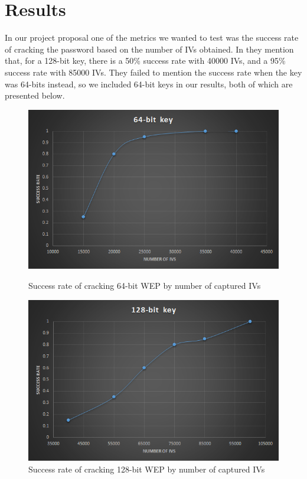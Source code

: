 \documentclass[10pt, titlepage]{article}
\begin{document}
\section{Results}
In our project proposal one of the metrics we wanted to test was the success rate of cracking the password based on the number of IVs obtained. In \cite{mainPaper} they mention that, for a 128-bit key, there is a 50\% success rate with 40000 IVs, and a 95\% success rate with 85000 IVs. They failed to mention the success rate when the key was 64-bits instead, so we included 64-bit keys in our results, both of which are presented below.\\

\begin{figure}[H]
    \centering
    \begin{minipage}{0.45\textwidth}
        \centering
        \includegraphics[width=1.0\textwidth]{./images/64bit.png} 
        \caption{Success rate of cracking 64-bit WEP by number of captured IVs}
    \end{minipage}\hfill
    \begin{minipage}{0.45\textwidth}
        \centering
        \includegraphics[width=1.0\textwidth]{./images/128bit.png}
        \caption{Success rate of cracking 128-bit WEP by number of captured IVs}
    \end{minipage}
\end{figure}
\end{document}
